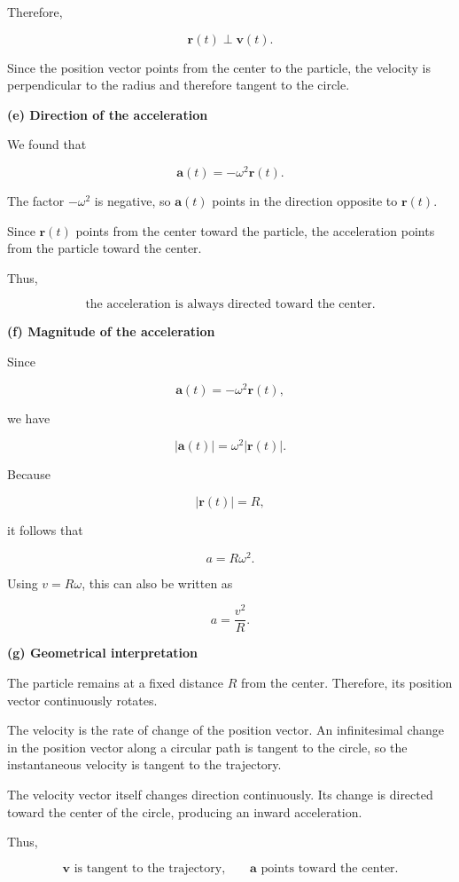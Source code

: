 \documentclass[../main.tex]{subfiles}
\theoremstyle{remark}
\begin{document}
Therefore,

\[
\boxed{
\mathbf{r}(t)\perp\mathbf{v}(t).
}
\]

Since the position vector points from the center to the particle, the velocity is perpendicular to the radius and therefore tangent to the circle.

\textbf{(e) Direction of the acceleration}

We found that

\[
\mathbf{a}(t)=-\omega^2\mathbf{r}(t).
\]

The factor \(-\omega^2\) is negative, so \(\mathbf{a}(t)\) points in the direction opposite to \(\mathbf{r}(t)\).

Since \(\mathbf{r}(t)\) points from the center toward the particle, the acceleration points from the particle toward the center.

Thus,

\[
\boxed{
\text{the acceleration is always directed toward the center.}
}
\]

\textbf{(f) Magnitude of the acceleration}

Since

\[
\mathbf{a}(t)=-\omega^2\mathbf{r}(t),
\]

we have

\[
|\mathbf{a}(t)|
=
\omega^2|\mathbf{r}(t)|.
\]

Because

\[
|\mathbf{r}(t)|=R,
\]

it follows that

\[
\boxed{
a=R\omega^2.
}
\]

Using \(v=R\omega\), this can also be written as

\[
\boxed{
a=\frac{v^2}{R}.
}
\]

\textbf{(g) Geometrical interpretation}

The particle remains at a fixed distance \(R\) from the center. Therefore, its position vector continuously rotates.

The velocity is the rate of change of the position vector. An infinitesimal change in the position vector along a circular path is tangent to the circle, so the instantaneous velocity is tangent to the trajectory.

The velocity vector itself changes direction continuously. Its change is directed toward the center of the circle, producing an inward acceleration.

Thus,

\[
\boxed{
\mathbf{v}\text{ is tangent to the trajectory,}
\qquad
\mathbf{a}\text{ points toward the center.}
}
\]
\end{document}
